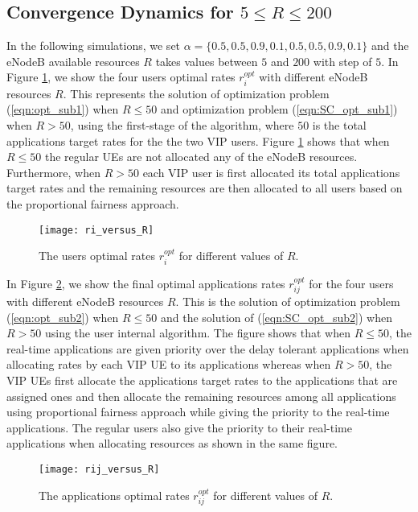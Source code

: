 \documentclass[journal]{IEEEtran} 				\IEEEoverridecommandlockouts 						\usepackage{amsmath,amssymb}
\begin{document}
\subsection{Convergence Dynamics for $5 \le R \le 200$}
In the following simulations, we set $\alpha=\{0.5,0.5,0.9,0.1,0.5,0.5,0.9,0.1\}$ and the eNodeB available resources $R$ takes values between $5$ and $200$ with step of $5$. In Figure \ref{fig:ri_versus_R}, we show the four users optimal rates $r_i^{opt}$ with different eNodeB resources $R$. This represents the solution of optimization problem (\ref{eqn:opt_sub1}) when $R\leq50$ and optimization problem (\ref{eqn:SC_opt_sub1}) when $R>50$, using the first-stage of the algorithm, where $50$ is the total applications target rates for the the two VIP users. Figure \ref{fig:ri_versus_R} shows that when $R\leq 50$ the regular UEs are not allocated any of the eNodeB resources. Furthermore, when $R>50$ each VIP user is first allocated its total applications target rates and the remaining resources are then allocated to all users based on the proportional fairness approach.

\begin{figure}
\centering
\texttt{[image: ri\_versus\_R]}
\caption{The users optimal rates $r_i^{opt}$ for different values of $R$.}
\label{fig:ri_versus_R}
\end{figure}
In Figure \ref{fig:rij_versus_R}, we show the final optimal  applications rates $r_{ij}^{opt}$ for the four users with different eNodeB resources $R$. This is the solution of optimization problem (\ref{eqn:opt_sub2}) when $R\leq50$ and the solution of (\ref{eqn:SC_opt_sub2}) when $R>50$ using the user internal algorithm. The figure shows that when $R\leq50$, the real-time applications are given priority over the delay tolerant applications when allocating rates by each VIP UE to its applications whereas when $R>50$, the VIP UEs first allocate the applications target rates to the applications that are assigned ones and then allocate the remaining resources among all applications using proportional fairness approach while giving the priority to the real-time applications. The regular users also give the priority to their real-time applications when allocating resources as shown in the same figure.
\begin{figure}
\centering
\texttt{[image: rij\_versus\_R]}
\caption{The applications optimal rates $r_{ij}^{opt}$ for different values of $R$.}
\label{fig:rij_versus_R}
\end{figure}
\end{document}
